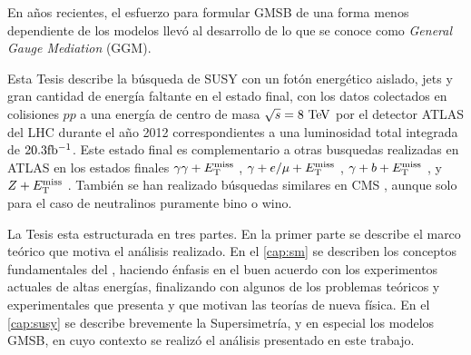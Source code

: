 En a\~nos recientes, el esfuerzo para formular GMSB de una forma menos dependiente de
los modelos llevó al desarrollo de lo que se conoce como \emph{General Gauge Mediation} (GGM).


Esta Tesis describe la búsqueda de SUSY con un fotón energético aislado, jets
y gran cantidad de energía faltante en el estado final, con los datos colectados en colisiones $pp$
a una energía de centro de masa $\sqrt{s} = 8 \tev$ por el detector
ATLAS del LHC durante el a\~no 2012 correspondientes a una luminosidad total
integrada de $20.3 \mbox{fb$^{-1}$}$. Este estado final es complementario a otras busquedas
realizadas en ATLAS en los estados finales $\gamma\gamma+E_{\mathrm{T}}^{\mathrm{miss}}$ \cite{Aad2012519,ATLAS-CONF-2014-001},
$\gamma+e/\mu+E_{\mathrm{T}}^{\mathrm{miss}}$ \cite{ATLAS-CONF-2012-144}, $\gamma+b+E_{\mathrm{T}}^{\mathrm{miss}}$
\cite{Aad:2012jva}, y $Z+E_{\mathrm{T}}^{\mathrm{miss}}$ \cite{ATLAS-CONF-2012-152}.
También se han realizado búsquedas similares en CMS \cite{CMS-PAS-SUS-12-018,CMS-PAS-SUS-14-004},
aunque solo para el caso de neutralinos puramente bino o wino.


La Tesis esta estructurada en tres partes. En la primer parte se describe el
marco teórico que motiva el análisis realizado. En el \cref{cap:sm} se describen
los conceptos fundamentales del {\SM}, haciendo énfasis en el buen acuerdo
con los experimentos actuales de altas energías, finalizando con
algunos de los problemas teóricos y experimentales que presenta y que motivan las
teorías de nueva física. En el \cref{cap:susy} se describe brevemente la
Supersimetría, y en especial los modelos GMSB, en cuyo contexto se realizó el análisis
presentado en este trabajo.

